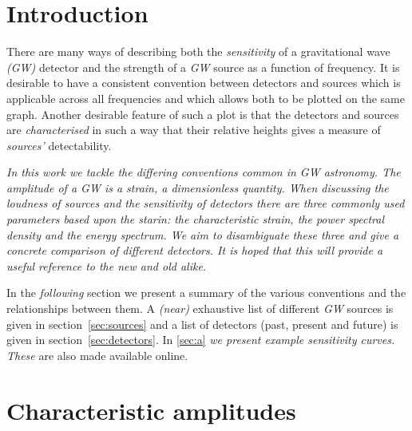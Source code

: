 \section{Introduction}

There are many ways of describing both the \emph{sensitivity} of a gravitational wave \emph{(GW)} detector and the strength of a \emph{GW} source as a function of frequency. It is desirable to have a consistent convention between detectors and sources which is applicable across all frequencies and which allows both to be plotted on the same graph. Another desirable feature of such a plot is that the detectors and sources are \emph{characterised} in such a way that their relative heights gives a measure of \emph{sources'} detectability.

\emph{In this work we tackle the differing conventions common in GW astronomy. The amplitude of a GW is a strain, a dimensionless quantity. When discussing the loudness of sources and the sensitivity of detectors there are three commonly used parameters based upon the starin: the characteristic strain, the power spectral density and the energy spectrum. We aim to disambiguate these three and give a concrete comparison of different detectors. It is hoped that this will provide a useful reference to the new and old alike.}

In the \emph{following} section we present a summary of the various conventions and the relationships between them. A \emph{(near)} exhaustive list of different \emph{GW} sources is given in section~\ref{sec:sources} and a list of detectors (past, present and future) is given in section~\ref{sec:detectors}. In \ref{sec:a} \emph{we present example sensitivity curves.} \emph{These} are also made available online.

\section{Characteristic amplitudes}

